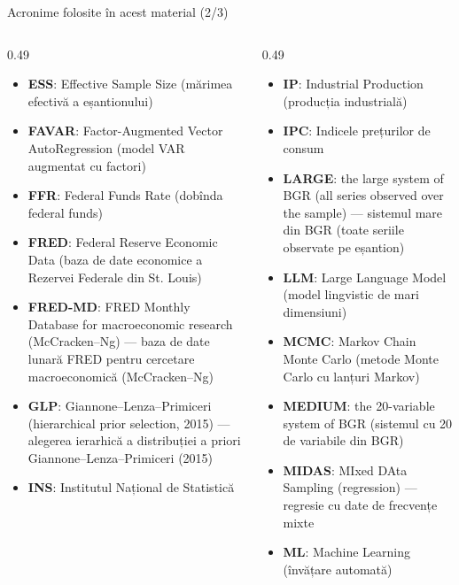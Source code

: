 \begin{frame}{Acronime folosite în acest material (2/3)}
\begin{columns}[T]
\begin{column}{0.49\textwidth}
\begin{itemize}\setlength{\itemsep}{0pt}
    \item \textbf{ESS}: Effective Sample Size (mărimea efectivă a eșantionului)
    \item \textbf{FAVAR}: Factor-Augmented Vector AutoRegression (model VAR augmentat cu factori)
    \item \textbf{FFR}: Federal Funds Rate (dobînda federal funds)
    \item \textbf{FRED}: Federal Reserve Economic Data (baza de date economice a Rezervei Federale din St. Louis)
    \item \textbf{FRED-MD}: FRED Monthly Database for macroeconomic research (McCracken–Ng) — baza de date lunară FRED pentru cercetare macroeconomică (McCracken–Ng)
    \item \textbf{GLP}: Giannone–Lenza–Primiceri (hierarchical prior selection, 2015) — alegerea ierarhică a distribuției a priori Giannone–Lenza–Primiceri (2015)
    \item \textbf{INS}: Institutul Național de Statistică
\end{itemize}
\end{column}
\begin{column}{0.49\textwidth}
\begin{itemize}\setlength{\itemsep}{0pt}
    \item \textbf{IP}: Industrial Production (producția industrială)
    \item \textbf{IPC}: Indicele prețurilor de consum
    \item \textbf{LARGE}: the large system of BGR (all series observed over the sample) — sistemul mare din BGR (toate seriile observate pe eșantion)
    \item \textbf{LLM}: Large Language Model (model lingvistic de mari dimensiuni)
    \item \textbf{MCMC}: Markov Chain Monte Carlo (metode Monte Carlo cu lanțuri Markov)
    \item \textbf{MEDIUM}: the 20-variable system of BGR (sistemul cu 20 de variabile din BGR)
    \item \textbf{MIDAS}: MIxed DAta Sampling (regression) — regresie cu date de frecvențe mixte
    \item \textbf{ML}: Machine Learning (învățare automată)
\end{itemize}
\end{column}
\end{columns}
\end{frame}
